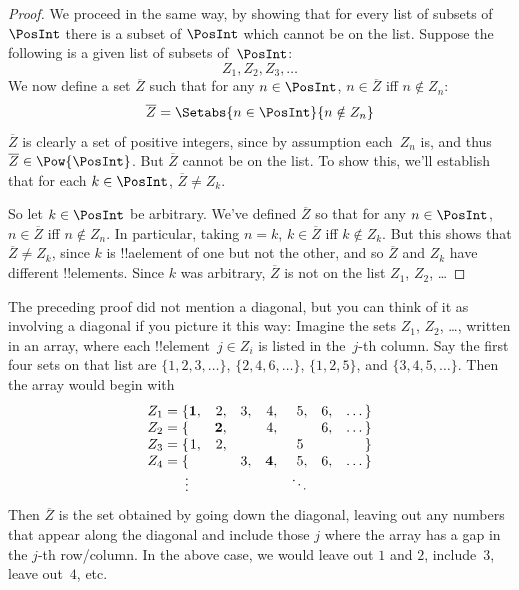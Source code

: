 \begin{proof}
We proceed in the same way, by showing that for every list of subsets
of~$\PosInt$ there is a subset of $\PosInt$ which cannot be on the list.
Suppose the following is a given list of subsets of~$\PosInt$:
\[
Z_{1}, Z_{2}, Z_{3}, \dots
\]
We now define a set $\overline{Z}$ such that for any $n \in \PosInt$,
$n \in \overline{Z}$ iff $n \notin Z_{n}$:
\[
\overline{Z} = \Setabs{n \in \PosInt}{n \notin Z_n}
\]
$\overline{Z}$ is clearly a set of positive integers, since by
assumption each~$Z_n$ is, and thus $\overline{Z} \in
\Pow{\PosInt}$. But $\overline{Z}$ cannot be on the list.  To show
this, we'll establish that for each $k \in \PosInt$, $\overline{Z} \neq
Z_k$. 

So let $k \in \PosInt$ be arbitrary. We've defined $\overline{Z}$ so
that for any $n \in \PosInt$, $n \in \overline{Z}$ iff $n \notin Z_n$.
In particular, taking $n=k$, $k \in \overline{Z}$ iff $k \notin Z_k$.
But this shows that $\overline{Z} \neq Z_k$, since $k$ is !!a{element}
of one but not the other, and so $\overline{Z}$ and $Z_k$ have
different !!{element}s. Since $k$ was arbitrary, $\overline{Z}$ is not
on the list $Z_1$, $Z_2$, \dots
\end{proof}

\begin{explain}
The preceding proof did not mention a diagonal, but you can think of
it as involving a diagonal if you picture it this way: Imagine the
sets $Z_1$, $Z_2$, \dots, written in an array, where each
!!{element}~$j \in Z_i$ is listed in the~$j$-th column. Say the first
four sets on that list are $\{1,2,3,\dots\}$, $\{2, 4, 6, \dots\}$,
$\{1,2,5\}$, and $\{3,4,5,\dots\}$. Then the array would begin with
\[
\begin{array}{r@{}rrrrrrr}
  Z_1 = \{ & \mathbf{1}, & 2, & 3, & 4, & 5, & 6, & \dots\}\\
  Z_2 = \{ &  & \mathbf{2}, &  & 4, &  & 6, & \dots\}\\
  Z_3 = \{ & 1, & 2, &  &  & 5\phantom{,} &  & \}\\
  Z_4 = \{ &  &  & 3, & \mathbf{4}, & 5, & 6, & \dots\}\\
  \vdots & & & & & \ddots
\end{array}
\]
Then $\overline{Z}$ is the set obtained by going down the diagonal,
leaving out any numbers that appear along the diagonal and include
those $j$ where the array has a gap in the $j$-th row/column. In the
above case, we would leave out $1$ and $2$, include~$3$, leave
out~$4$, etc.
\end{explain}

